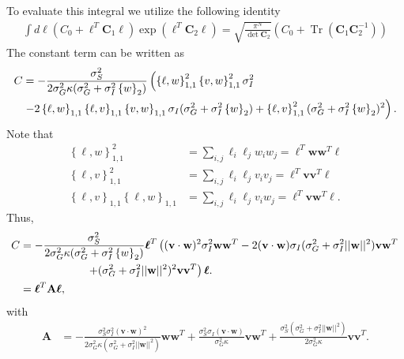 \documentclass[11pt]{article}
\DeclareMathOperator{\Tr}{Tr}
\begin{document}
To evaluate this integral we utilize the following identity
\begin{align}
\int d\boldsymbol{\ell} \left(C_0 +\boldsymbol{\ell}^T \mathbf{C}_1 \boldsymbol{\ell}\right)\exp\left(\boldsymbol{\ell}^T \mathbf{C}_2 \boldsymbol{\ell}\right) = \sqrt{\frac{\pi^N}{\det \mathbf{C}_2}}\left(C_0 + \Tr\left(\mathbf{C}_1\mathbf{C}_2^{-1}\right)\right)
\end{align}
The constant term can be written as 
\begin{align}
	C &= -\frac{\sigma_S^2}{2\sigma_G^2 \kappa (\sigma_G^2 + \sigma_I^2 \left\{w\right\}_2)} \left(\left\{\ell, w\right\}_{1,1}^2 \left\{v,w\right\}_{1,1}^2 \sigma_I^2   \right. \notag \\
	&\left. - 2 \left\{\ell, w\right\}_{1,1} \left\{\ell ,v \right\}_{1,1} \left\{v,w\right\}_{1,1} \sigma_I (\sigma_G^2 + \sigma_I^2 \left\{w\right\}_2) + \left\{\ell, v\right\}_{1,1}^2 (\sigma_G^2 +\sigma_I^2 \left\{w\right\}_2)^2\right).
\end{align}
Note that 
\begin{align}
	\left\{\ell, w\right\}_{1,1}^2 &= \sum_{i,j} \ell_i \ell_j w_i w_j = \boldsymbol{\ell}^T \mathbf{ww}^T \boldsymbol{\ell} \\
	\left\{\ell, v\right\}_{1,1}^2 &= \sum_{i,j} \ell_i \ell_j  v_i v_j = \boldsymbol{\ell}^T \mathbf{vv}^T \boldsymbol{\ell} \\
	\left\{\ell, v\right\}_{1,1} \left\{\ell,w\right\}_{1,1}&= \sum_{i,j} \ell_i \ell_j v_i w_j= \boldsymbol{\ell}^T \mathbf{vw}^T \boldsymbol{\ell}.
\end{align}
Thus,
\begin{align}
C &= -\frac{\sigma_S^2}{2\sigma_G^2 \kappa (\sigma_G^2 + \sigma_I^2 \left\{w\right\}_2)}\boldsymbol{\ell}^T \left((\mathbf{v}\cdot \mathbf{w})^2 \sigma_I^2 \mathbf{w}\mathbf{w}^T - 2(\mathbf{v}\cdot \mathbf{w}) \sigma_I (\sigma_G^2 +\sigma_I^2 ||\mathbf{w}||^2) \mathbf{v}\mathbf{w}^T \right. \notag \\
& \qquad \qquad \qquad \left. + (\sigma_G^2 +\sigma_I^2 ||\mathbf{w}||^2)^2\mathbf{v}\mathbf{v}^T \right) \boldsymbol{\ell}. \\
&= \boldsymbol{\ell}^T \mathbf{A} \boldsymbol{\ell},
\end{align}
with 
\begin{align}
\mathbf{A} &= -\frac{\sigma_S^2 \sigma_I^2 (\mathbf{v}\cdot \mathbf{w})^2}{2\sigma_G^2 \kappa (\sigma_G^2 +\sigma_I^2 ||\mathbf{w}||^2)} \mathbf{w}\mathbf{w}^T+ \frac{\sigma_S^2 \sigma_I (\mathbf{v}\cdot\mathbf{w})}{\sigma_G^2\kappa} \mathbf{vw}^T + \frac{\sigma_S^2 (\sigma_G^2 +\sigma_I^2 ||\mathbf{w}||^2)}{2 \sigma_G^2 \kappa} \mathbf{v}\mathbf{v}^T.
\end{align}
\end{document}

